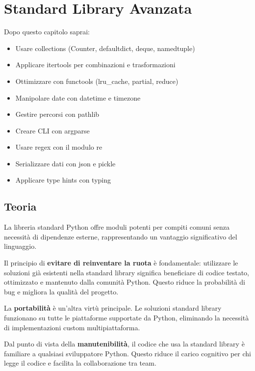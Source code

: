 \chapter{Standard Library Avanzata}

\begin{tcolorbox}[title=Obiettivi del capitolo]
Dopo questo capitolo saprai:
\begin{itemize}
  \item Usare collections (Counter, defaultdict, deque, namedtuple)
  \item Applicare itertools per combinazioni e trasformazioni
  \item Ottimizzare con functools (lru\_cache, partial, reduce)
  \item Manipolare date con datetime e timezone
  \item Gestire percorsi con pathlib
  \item Creare CLI con argparse
  \item Usare regex con il modulo re
  \item Serializzare dati con json e pickle
  \item Applicare type hints con typing
\end{itemize}
\end{tcolorbox}

\section{Teoria}

La libreria standard Python offre moduli potenti per compiti comuni senza necessità di dipendenze esterne, rappresentando un vantaggio significativo del linguaggio.

Il principio di \textbf{evitare di reinventare la ruota} è fondamentale: utilizzare le soluzioni già esistenti nella standard library significa beneficiare di codice testato, ottimizzato e mantenuto dalla comunità Python. Questo riduce la probabilità di bug e migliora la qualità del progetto.

La \textbf{portabilità} è un'altra virtù principale. Le soluzioni standard library funzionano su tutte le piattaforme supportate da Python, eliminando la necessità di implementazioni custom multipiattaforma.

Dal punto di vista della \textbf{manutenibilità}, il codice che usa la standard library è familiare a qualsiasi sviluppatore Python. Questo riduce il carico cognitivo per chi legge il codice e facilita la collaborazione tra team.

